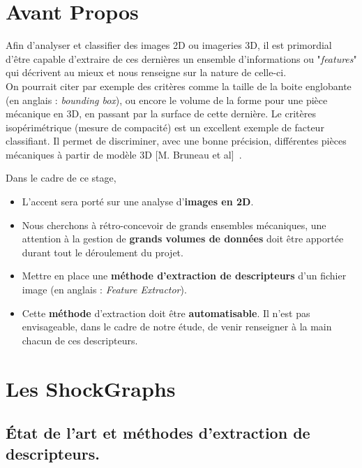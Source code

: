 \section*{Avant Propos}

Afin d'analyser et classifier des images 2D ou imageries 3D, il est primordial d'être capable d'extraire de ces dernières un ensemble d'informations ou "\textit{features}" qui décrivent au mieux et nous renseigne sur la nature de celle-ci.\\
On pourrait citer par exemple des critères comme la taille de la boite englobante (en anglais : \textit{bounding box}), ou encore le volume de la forme pour une pièce mécanique en 3D, en passant par la surface de cette dernière. Le critères isopérimétrique (mesure de compacité) est un excellent exemple de facteur classifiant. Il permet de discriminer, avec une bonne précision, différentes pièces mécaniques à partir de modèle 3D [M. Bruneau et al]~\cite{Bruneau2014}.

Dans le cadre de ce stage,\\
\begin{itemize}
	\item	L'accent sera porté sur une analyse d'\textbf{images en 2D}.\\
	\item	Nous cherchons à rétro-concevoir de grands ensembles mécaniques, une attention à la gestion de \textbf{grands volumes de données} doit être apportée durant tout le déroulement du projet.\\
	\item	Mettre en place une \textbf{méthode d'extraction de descripteurs} d'un fichier image (en anglais : \textit{Feature Extractor}).\\
	\item	Cette \textbf{méthode} d'extraction doit être \textbf{automatisable}. Il n'est pas envisageable, dans le cadre de notre étude, de venir renseigner à la main chacun de ces descripteurs.	
\end{itemize}
\vspace{3mm}
  

\section{Les ShockGraphs}

\subsection{État de l'art et méthodes d'extraction de descripteurs.}

